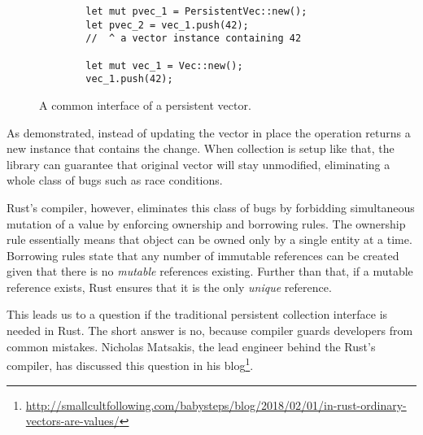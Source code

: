 \begin{figure}[!htbp]

    \centering
    \begin{verbatim}
        let mut pvec_1 = PersistentVec::new();
        let pvec_2 = vec_1.push(42);
        //  ^ a vector instance containing 42

        let mut vec_1 = Vec::new();
        vec_1.push(42);
    \end{verbatim}

    \caption{A common interface of a persistent vector.}
    \label{fig:common-interface}
\end{figure}

As demonstrated, instead of updating the vector in place the operation returns a new instance that contains the change. When collection is setup like that, the library can guarantee that original vector will stay unmodified, eliminating a whole class of bugs such as race conditions.


Rust's compiler, however, eliminates this class of bugs by forbidding simultaneous mutation of a value by enforcing ownership and borrowing rules. The ownership rule essentially means that object can be owned only by a single entity at a time. Borrowing rules state that any number of immutable references can be created given that there is no \emph{mutable} references existing. Further than that, if a mutable reference exists, Rust ensures that it is the only \emph{unique} reference.

This leads us to a question if the traditional persistent collection interface is needed in Rust. The short answer is no, because compiler guards developers from common mistakes. Nicholas Matsakis, the lead engineer behind the Rust's compiler, has discussed this question in his blog\footnote{\url{http://smallcultfollowing.com/babysteps/blog/2018/02/01/in-rust-ordinary-vectors-are-values/}}.



